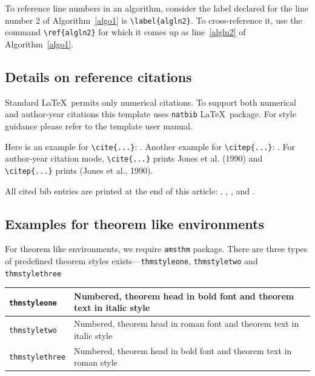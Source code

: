 \documentclass[ml4h-mathphys]{ml4h-jnl}%
\theoremstyle{thmstyleone}%
\theoremstyle{thmstyletwo}%
\theoremstyle{thmstylethree}%
\begin{document}
To reference line numbers in an algorithm, consider the label declared for the line number 2 of Algorithm~\ref{algo1} is \verb+\label{algln2}+. To cross-reference it, use the command \verb+\ref{algln2}+ for which it comes up as line~\ref{algln2} of Algorithm~\ref{algo1}.

\subsection{Details on reference citations}\label{subsec7}

Standard \LaTeX\ permits only numerical citations. To support both numerical and author-year citations this template uses \verb+natbib+ \LaTeX\ package. For style guidance please refer to the template user manual.

Here is an example for \verb+\cite{...}+: \cite{bib1}. Another example for \verb+\citep{...}+: \citep{bib2}. For author-year citation mode, \verb+\cite{...}+ prints Jones et al. (1990) and \verb+\citep{...}+ prints (Jones et al., 1990).

All cited bib entries are printed at the end of this article: \cite{bib3}, \cite{bib4}, \cite{bib5}, \cite{bib6} and \cite{bib7}.

\subsection{Examples for theorem like environments}\label{sec10}

For theorem like environments, we require \verb+amsthm+ package. There are three types of predefined theorem styles exists---\verb+thmstyleone+, \verb+thmstyletwo+ and \verb+thmstylethree+ 

\bigskip
\begin{tabular}{|l|p{19pc}|}
\hline
\verb+thmstyleone+ & Numbered, theorem head in bold font and theorem text in italic style \\\hline
\verb+thmstyletwo+ & Numbered, theorem head in roman font and theorem text in italic style \\\hline
\verb+thmstylethree+ & Numbered, theorem head in bold font and theorem text in roman style \\\hline
\end{tabular}
\bigskip
\end{document}

